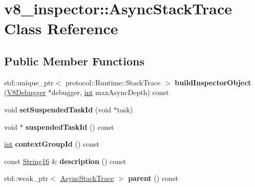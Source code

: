 \hypertarget{classv8__inspector_1_1AsyncStackTrace}{}\section{v8\+\_\+inspector\+:\+:Async\+Stack\+Trace Class Reference}
\label{classv8__inspector_1_1AsyncStackTrace}
\subsection*{Public Member Functions}
\begin{DoxyCompactItemize}
\item 
\mbox{\label{classv8__inspector_1_1AsyncStackTrace_a894b6f421aa55c9b2b78f82c171e3d57}} 
std\+::unique\+\_\+ptr$<$ protocol\+::\+Runtime\+::\+Stack\+Trace $>$ {\bfseries build\+Inspector\+Object} (\mbox{\hyperlink{classv8__inspector_1_1V8Debugger}{V8\+Debugger}} $\ast$debugger, \mbox{\hyperlink{classint}{int}} max\+Async\+Depth) const
\item 
\mbox{\label{classv8__inspector_1_1AsyncStackTrace_ab975817a6336693bd1dadba84b96e74e}} 
void {\bfseries set\+Suspended\+Task\+Id} (void $\ast$task)
\item 
\mbox{\label{classv8__inspector_1_1AsyncStackTrace_a6697dcaaf5ff16933fea24b10be5617a}} 
void $\ast$ {\bfseries suspended\+Task\+Id} () const
\item 
\mbox{\label{classv8__inspector_1_1AsyncStackTrace_acd8dfa65bd5caf45dbad8dae4f006eec}} 
\mbox{\hyperlink{classint}{int}} {\bfseries context\+Group\+Id} () const
\item 
\mbox{\label{classv8__inspector_1_1AsyncStackTrace_a2e204311ca4633cdb0bca77e19219c06}} 
const \mbox{\hyperlink{classv8__inspector_1_1String16}{String16}} \& {\bfseries description} () const
\item 
\mbox{\label{classv8__inspector_1_1AsyncStackTrace_a252df85108a9dca099b71ae173e49a6a}} 
std\+::weak\+\_\+ptr$<$ \mbox{\hyperlink{classv8__inspector_1_1AsyncStackTrace}{Async\+Stack\+Trace}} $>$ {\bfseries parent} () const

\end{DoxyCompactItemize}
